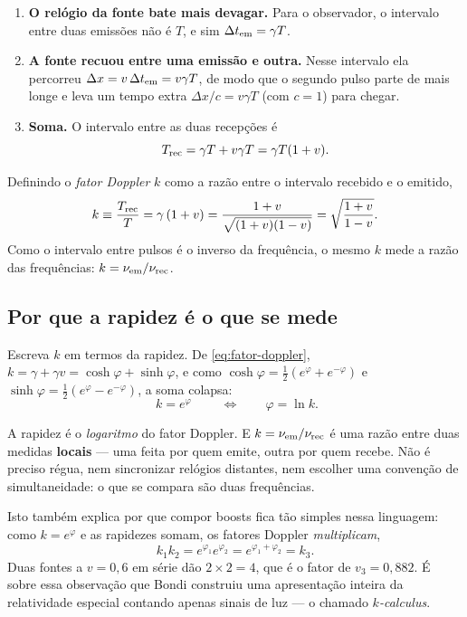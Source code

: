 \documentclass[12pt,a4paper,oneside]{book}
\theoremstyle{rgplain}
\theoremstyle{rgremark}
\begin{document}
\begin{enumerate}
  \item \textbf{O relógio da fonte bate mais devagar.} Para o observador, o
  intervalo entre duas emissões não é $T$, e sim $\Delta t_{\rm em}=\gamma T$.
  \item \textbf{A fonte recuou entre uma emissão e outra.} Nesse intervalo ela
  percorreu $\Delta x=v\,\Delta t_{\rm em}=v\gamma T$, de modo que o segundo
  pulso parte de mais longe e leva um tempo extra $\Delta x/c=v\gamma T$ (com
  $c=1$) para chegar.
  \item \textbf{Soma.} O intervalo entre as duas recepções é
  \[
    T_{\rm rec}=\gamma T+v\gamma T=\gamma T(1+v).
  \]
\end{enumerate}

Definindo o \emph{fator Doppler} $k$ como a razão entre o intervalo recebido e
o emitido,
\begin{equation}
  k\equiv\frac{T_{\rm rec}}{T}=\gamma\,(1+v)
   =\frac{1+v}{\sqrt{(1+v)(1-v)}}
   =\sqrt{\frac{1+v}{1-v}} .
  \label{eq:fator-doppler}
\end{equation}
Como o intervalo entre pulsos é o inverso da frequência, o mesmo $k$ mede a
razão das frequências: $k=\nu_{\rm em}/\nu_{\rm rec}$.

\subsection*{Por que a rapidez é o que se mede}

Escreva $k$ em termos da rapidez. De \eqref{eq:fator-doppler},
$k=\gamma+\gamma v=\cosh\varphi+\sinh\varphi$, e como
$\cosh\varphi=\tfrac12(e^{\varphi}+e^{-\varphi})$ e
$\sinh\varphi=\tfrac12(e^{\varphi}-e^{-\varphi})$, a soma colapsa:
\begin{equation}
  \boxed{\;k=e^{\varphi}\;}
  \qquad\Longleftrightarrow\qquad
  \varphi=\ln k .
  \label{eq:doppler-rapidez}
\end{equation}

\begin{central}
A rapidez é o \emph{logaritmo} do fator Doppler. E $k=\nu_{\rm em}/\nu_{\rm rec}$
é uma razão entre duas medidas \textbf{locais} --- uma feita por quem emite,
outra por quem recebe. Não é preciso régua, nem sincronizar relógios
distantes, nem escolher uma convenção de simultaneidade: o que se compara são
duas frequências.
\end{central}

Isto também explica por que compor boosts fica tão simples nessa linguagem:
como $k=e^{\varphi}$ e as rapidezes somam, os fatores Doppler
\emph{multiplicam},
\[
  k_1k_2=e^{\varphi_1}e^{\varphi_2}=e^{\varphi_1+\varphi_2}=k_3 .
\]
Duas fontes a $v=0{,}6$ em série dão $2\times2=4$, que é o fator de
$v_3=0{,}882$. É sobre essa observação que Bondi construiu uma apresentação
inteira da relatividade especial contando apenas sinais de luz --- o chamado
\emph{$k$-calculus}.
\end{document}
